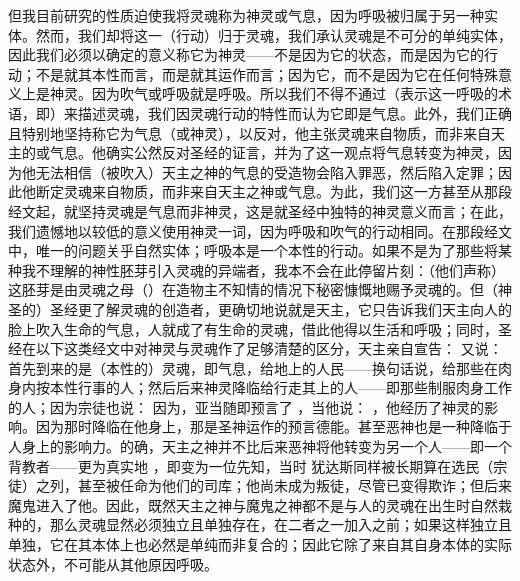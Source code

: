 但我目前研究的性质迫使我将灵魂称为神灵或气息，因为呼吸被归属于另一种实体。然而，我们却将这一（行动）归于灵魂，我们承认灵魂是不可分的单纯实体，因此我们必须以确定的意义称它为神灵——不是因为它的状态，而是因为它的行动；不是就其本性而言，而是就其运作而言；因为它，而不是因为它在任何特殊意义上是神灵。因为吹气或呼吸就是呼吸。所以我们不得不通过（表示这一呼吸的术语，即）来描述灵魂，我们因灵魂行动的特性而认为它即是气息。此外，我们正确且特别地坚持称它为气息（或神灵），以反对，他主张灵魂来自物质，而非来自天主的或气息。他确实公然反对圣经的证言，并为了这一观点将气息转变为神灵，因为他无法相信（被吹入）天主之神的气息的受造物会陷入罪恶，然后陷入定罪；因此他断定灵魂来自物质，而非来自天主之神或气息。为此，我们这一方甚至从那段经文起，就坚持灵魂是气息而非神灵，这是就圣经中独特的神灵意义而言；在此，我们遗憾地以较低的意义使用神灵一词，因为呼吸和吹气的行动相同。在那段经文中，唯一的问题关乎自然实体；呼吸本是一个本性的行动。如果不是为了那些将某种我不理解的神性胚芽引入灵魂的异端者，我本不会在此停留片刻：（他们声称）这胚芽是由灵魂之母（）在造物主不知情的情况下秘密慷慨地赐予灵魂的。但（神圣的）圣经更了解灵魂的创造者，更确切地说就是天主，它只告诉我们天主向人的脸上吹入生命的气息，人就成了有生命的灵魂，借此他得以生活和呼吸；同时，圣经在以下这类经文中对神灵与灵魂作了足够清楚的区分，天主亲自宣告： 又说：  首先到来的是（本性的）灵魂，即气息，给地上的人民——换句话说，给那些在肉身内按本性行事的人；然后后来神灵降临给行走其上的人——即那些制服肉身工作的人；因为宗徒也说：  因为，亚当随即预言了 ，当他说： ，他经历了神灵的影响。因为那时降临在他身上，那是圣神运作的预言德能。甚至恶神也是一种降临于人身上的影响力。的确，天主之神并不比后来恶神将他转变为另一个人——即一个背教者——更为真实地 ，即变为一位先知，当时  犹达斯同样被长期算在选民（宗徒）之列，甚至被任命为他们的司库；他尚未成为叛徒，尽管已变得欺诈；但后来魔鬼进入了他。因此，既然天主之神与魔鬼之神都不是与人的灵魂在出生时自然栽种的，那么灵魂显然必须独立且单独存在，在二者之一加入之前；如果这样独立且单独，它在其本体上也必然是单纯而非复合的；因此它除了来自其自身本体的实际状态外，不可能从其他原因呼吸。\par

